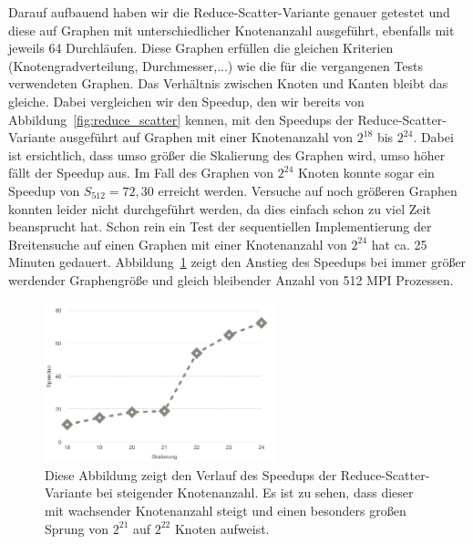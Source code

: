 \documentclass[11pt,a4paper]{article}
\begin{document}
Darauf aufbauend haben wir die Reduce-Scatter-Variante genauer getestet und diese auf Graphen mit unterschiedlicher Knotenanzahl ausgeführt, ebenfalls mit jeweils 64 Durchläufen. Diese Graphen erfüllen die gleichen Kriterien (Knotengradverteilung, Durchmesser,...) wie die für die vergangenen Tests verwendeten Graphen. Das Verhältnis zwischen Knoten und Kanten bleibt das gleiche. Dabei vergleichen wir den Speedup, den wir bereits von Abbildung~\ref{fig:reduce_scatter} kennen, mit den Speedups der Reduce-Scatter-Variante ausgeführt auf Graphen mit einer Knotenanzahl von \(2^{18}\) bis \(2^{24}\). Dabei ist ersichtlich, dass umso größer die Skalierung des Graphen wird, umso höher fällt der Speedup aus. Im Fall des Graphen von \(2^{24}\) Knoten konnte sogar ein Speedup von \(S_{512} = 72,30\) erreicht werden. Versuche auf noch größeren Graphen konnten leider nicht durchgeführt werden, da dies einfach schon zu viel Zeit beansprucht hat. Schon rein ein Test der sequentiellen Implementierung der Breitensuche auf einen Graphen mit einer Knotenanzahl von \(2^{24}\) hat ca. 25 Minuten gedauert. Abbildung~\ref{fig:speedups_reduce_scatter} zeigt den Anstieg des Speedups bei immer größer werdender Graphengröße und gleich bleibender Anzahl von 512 MPI Prozessen.
\begin{figure}[h]
 	\centering
	\includegraphics[width=0.6\textwidth]{speedups}
 	\caption{Diese Abbildung zeigt den Verlauf des Speedups der Reduce-Scatter-Variante bei steigender Knotenanzahl. Es ist zu sehen, dass dieser mit wachsender Knotenanzahl steigt und einen besonders großen Sprung von \(2^{21}\) auf \(2^{22}\) Knoten aufweist. }
	\label{fig:speedups_reduce_scatter}
\end{figure}
\end{document}
